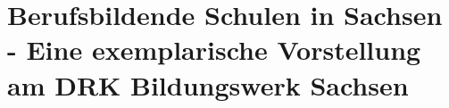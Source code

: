 \section{Berufsbildende Schulen in Sachsen - Eine exemplarische Vorstellung am DRK Bildungswerk Sachsen}
\label{sec:k4_Berufsbildende Schulen in Sachsen - Eine exemplarische Vorstellung am DRK Bildungswerk Sachsen}



